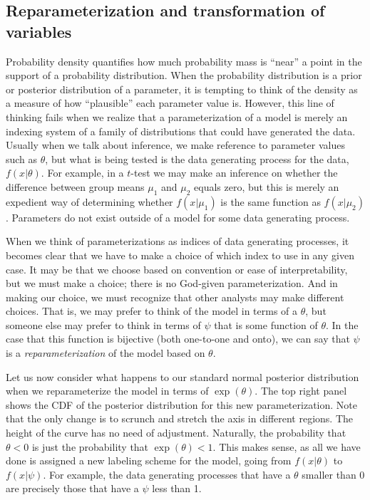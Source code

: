 \documentclass[9pt,twocolumn,twoside]{cidlab-draft}\templatetype{cidlab-invited}
\begin{document}
\subsection*{Reparameterization and transformation of variables}
Probability density quantifies how much probability mass is ``near'' a point in the support of a probability distribution. When the probability distribution is a prior or posterior distribution of a parameter, it is tempting to think of the density as a measure of how ``plausible'' each parameter value is. However, this line of thinking fails when we realize that a parameterization of a model is merely an indexing system of a family of distributions that could have generated the data. Usually when we talk about inference, we make reference to parameter values such as $\theta$, but what is being tested is the data generating process for the data, $f(x|\theta)$. For example, in a $t$-test we may make an inference on whether the difference between group means $\mu_1$ and $\mu_2$ equals zero, but this is merely an expedient way of determining whether $f(x|\mu_1)$ is the same function as $f(x|\mu_2)$. Parameters do not exist outside of a model for some data generating process. 

When we think of parameterizations as indices of data generating processes, it becomes clear that we have to make a choice of which index to use in any given case. It may be that we choose based on convention or ease of interpretability, but we must make a choice; there is no God-given parameterization. And in making our choice, we must recognize that other analysts may make different choices. That is, we may prefer to think of the model in terms of a $\theta$, but someone else may prefer to think in terms of $\psi$ that is some function of $\theta$. In the case that this function is bijective (both one-to-one and onto), we can say that $\psi$ is a \textit{reparameterization} of the model based on $\theta$. 

Let us now consider what happens to our standard normal posterior distribution when we reparameterize the model in terms of $\exp{(\theta)}$.  The top right panel shows the CDF of the posterior distribution for this new parameterization. Note that the only change is to scrunch and stretch the axis in different regions.  The height of the curve has no need of adjustment. Naturally, the probability that $\theta<0$ is just the probability that $\exp{(\theta)}<1$. This makes sense, as all we have done is assigned a new labeling scheme for the model, going from $f(x|\theta)$ to $f(x|\psi)$.  For example, the data generating processes that have a $\theta$ smaller than 0 are precisely those that have a $\psi$ less than 1. 
 
\end{document}
